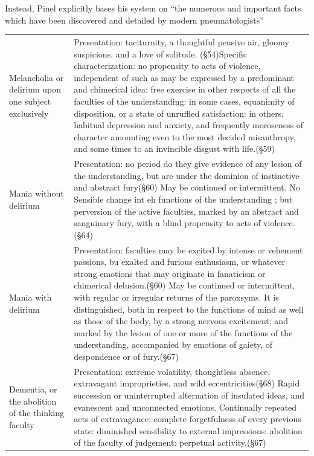 \begin{refsection}
Instead, Pinel explicitly bases his system on “the numerous and important facts which have been discovered and detailed by modern pneumatologists” ~\citep[p. 135]{Pinel:1806ws} 

 \begin{longtable}[!t]{ | P{2cm} | P{11cm}  | }
\hline
{}& \\ \hline 
Melancholia or delirium upon one subject exclusively&Presentation: taciturnity, a thoughtful pensive air, gloomy suspicions, and a love of solitude. (\S 54)\newline  Specific characterization: no propensity to acts of violence, independent of such as may be expressed by a predominant and chimerical idea: free exercise in other respects of all the faculties of the understanding: in some cases, equanimity of disposition, or a state of unruffled satisfaction: in others, habitual depression and anxiety, and frequently moroseness of character amounting even to the most decided misanthropy, and some times to an invincible disgust with life.(\S 59) \\ \hline
Mania without delirium&Presentation: no period do they give evidence of any lesion of the understanding, but are under the dominion of instinctive and abstract fury(\S 60) \newline
May be continued or intermittent. No Sensible change int eh functions of the understanding ; but perversion of the active faculties, marked by an abstract and sanguinary fury, with a blind propensity to acts of violence. (\S 64) \\ \hline
Mania with delirium&Presentation: faculties may be excited by intense or vehement passions, bu exalted and furious enthusiasm, or whatever strong emotions that may originate in fanaticism or chimerical delusion.(\S 60) \newline
May be continued or intermittent, with regular or irregular returns of the paroxsyms. It is distinguished, both in respect to the functions of mind as well as those of the body, by a strong nervous excitement; and marked by the lesion of one or more of the functions of the understanding, accompanied by emotions of gaiety, of despondence or of fury.(\S 67) \\ \hline
Dementia, or the abolition of the thinking faculty&Presentation: extreme volatility, thoughtless absence, extravagant improprieties, and wild eccentricities(\S 68) \newline
Rapid succession or uninterrupted alternation of insulated ideas, and evanescent and unconnected emotions. Continually repeated acts of extravagance: complete forgetfulness of every previous state: diminished sensibility to external impressions: abolition of the faculty of judgement: perpetual activity.(\S 67) \\ \hline

\end{longtable}
\end{refsection}

